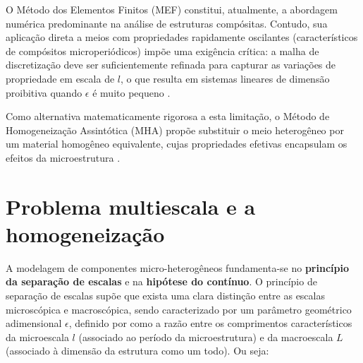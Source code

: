O Método dos Elementos Finitos (MEF) constitui, atualmente, a abordagem numérica predominante na análise de estruturas compósitas. Contudo, sua aplicação direta a meios com propriedades rapidamente oscilantes  (característicos de compósitos microperiódicos) impõe uma exigência crítica: a malha de discretização deve ser suficientemente refinada para capturar as variações de propriedade em escala de $l$, o que resulta em sistemas lineares de dimensão proibitiva quando $\epsilon$ é muito pequeno \cite{Guinovart2024}.

Como alternativa matematicamente rigorosa a esta limitação, o Método de
Homogeneização Assintótica (MHA) propõe substituir o meio heterogêneo
por um material homogêneo equivalente, cujas propriedades efetivas
encapsulam os efeitos da microestrutura \cite{bakhvalov1989}.

\section{Problema multiescala e a homogeneização}
A modelagem de componentes micro-heterogêneos fundamenta-se no \textbf{princípio da separação de escalas} e na \textbf{hipótese do contínuo}. O princípio de separação de escalas supõe que exista uma clara distinção entre as escalas microscópica e macroscópica, sendo caracterizado por um parâmetro geométrico adimensional $\epsilon$, definido por \cite[p.~17]{bakhvalov1989} como a razão entre os comprimentos característicos da microescala $l$ (associado ao período da microestrutura) e da macroescala $L$ (associado à dimensão da estrutura como um todo). Ou seja:

